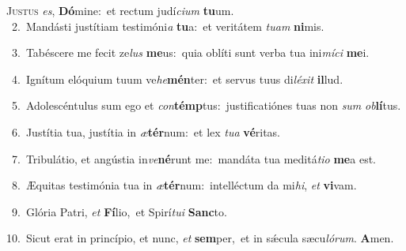 \lettrine{\initial\textcolor{\initialcolor}{J}}{ustus} \textit{es}\-, \textbf{Dó}\-mine:~\star et rectum judí\-\textit{ci}\-\textit{um} \textbf{tu}\-um.\\
{\numbfont\textcolor{\numbcolor}{~2.}}~Mandásti justítiam testimóni\textit{a} \textbf{tu}\-a:~\star et veritátem \textit{tu}\-\textit{am} \textbf{ni}\-mis.\par
{\numbfont\textcolor{\numbcolor}{~3.}}~Tabéscere me fecit ze\textit{lus} \textbf{me}\-us:~\star quia oblíti sunt verba tua ini\-\textit{mí}\-\textit{ci} \textbf{me}\-i.\par
{\numbfont\textcolor{\numbcolor}{~4.}}~Ignítum elóquium tuum ve\-\textit{he}\-\textbf{mén}ter:~\star et servus tuus di\-\textit{lé}\-\textit{xit} \textbf{il}\-lud.\par
{\numbfont\textcolor{\numbcolor}{~5.}}~Adolescéntulus sum ego et \textit{con}\-\textbf{témp}tus:~\star justificatiónes tuas non \textit{sum} \textit{ob}\-\textbf{lí}tus.\par
{\numbfont\textcolor{\numbcolor}{~6.}}~Justítia tua, justítia in \textit{æ}\-\textbf{tér}num:~\star et lex \textit{tu}\-\textit{a} \textbf{vé}\-ritas.\par
{\numbfont\textcolor{\numbcolor}{~7.}}~Tribulátio, et angústia in\-\textit{ve}\-\textbf{né}runt me:~\star mandáta tua meditá\-\textit{ti}\-\textit{o} \textbf{me}\-a est.\par
{\numbfont\textcolor{\numbcolor}{~8.}}~Æquitas testimónia tua in \textit{æ}\-\textbf{tér}num:~\star intelléctum da mi\-\textit{hi}\-, \textit{et} \textbf{vi}\-vam.\par
{\numbfont\textcolor{\numbcolor}{~9.}}~Glória Patri, \textit{et} \textbf{Fí}\-lio,~\star et Spirí\-\textit{tu}\-\textit{i} \textbf{Sanc}\-to.\par
{\numbfont\textcolor{\numbcolor}{10.}}~Sicut erat in princípio, et nunc, \textit{et} \textbf{sem}\-per,~\star et in sǽcula sæcu\-\textit{ló}\-\textit{rum}. \textbf{A}\-men.\par

